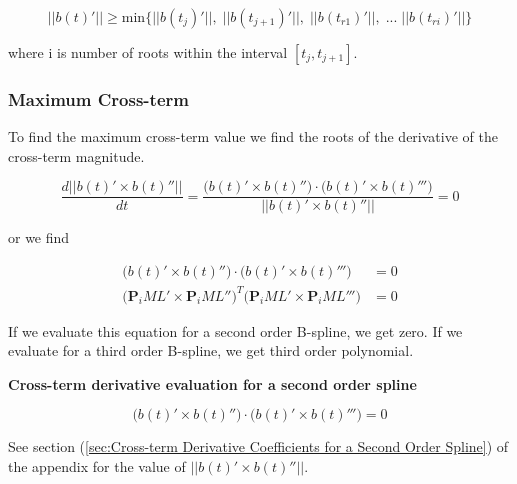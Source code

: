 \documentclass{article}
\begin{document}
\begin{equation}
    ||b(t)'|| \geq \text{min}\{ ||b(t_j)'|| ,\; ||b(t_{j+1})'|| ,\; ||b(t_{r1})'|| ,\; ... \;  ||b(t_{ri})'|| \}
\end{equation}

where i is number of roots within the interval \([t_j , t_{j+1}]\).

\subsubsection{Maximum Cross-term}

To find the maximum cross-term value we find the roots of the derivative of the cross-term magnitude.

\begin{equation}
    \frac{d||b(t)' \times b(t)''||}{dt} = \frac{\big(b(t)' \times b(t)''\big) \cdot \big(b(t)' \times b(t)'''\big)}{||b(t)' \times b(t)''||} = 0
\end{equation}

or we find

\begin{equation} \label{derivative of cross term}
\begin{aligned}
    \big(b(t)' \times b(t)''\big) \cdot \big(b(t)' \times b(t)'''\big) &= 0 \\
    \big(\textbf{P}_iML' \times \textbf{P}_iML''\big)^{T} \big(\textbf{P}_iML' \times \textbf{P}_iML'''\big) &= 0 
\end{aligned}
\end{equation}

If we evaluate this equation for a second order B-spline, we get zero. If we evaluate for a third order B-spline, we get third order polynomial.

\hspace{1cm}

    \textbf{Cross-term derivative evaluation for a second order spline}
    
\hspace{1cm}

\begin{equation}
    \big(b(t)' \times b(t)''\big) \cdot \big(b(t)' \times b(t)'''\big) = 0
\end{equation}

See section (\ref{sec:Cross-term Derivative Coefficients for a Second Order Spline}) of the appendix for the value of \(||b(t)' \times b(t)''||\).

\hspace{1cm}
\end{document}
